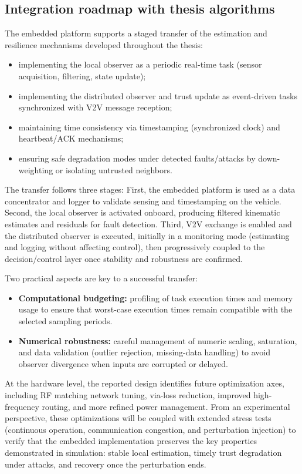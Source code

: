 \subsection{Integration roadmap with thesis algorithms}\label{chp6_subsec_board_roadmap}
The embedded platform supports a staged transfer of the estimation and resilience mechanisms developed throughout the thesis:
\begin{itemize}
	\item implementing the local observer as a periodic real-time task (sensor acquisition, filtering, state update);
	\item implementing the distributed observer and trust update as event-driven tasks synchronized with V2V message reception;
	\item maintaining time consistency via timestamping (synchronized clock) and heartbeat/ACK mechanisms;
	\item ensuring safe degradation modes under detected faults/attacks by down-weighting or isolating untrusted neighbors.
\end{itemize}
The transfer follows three stages:
First, the embedded platform is used as a data concentrator and logger to validate sensing and timestamping on the vehicle.
Second, the local observer is activated onboard, producing filtered kinematic estimates and residuals for fault detection.
Third, V2V exchange is enabled and the distributed observer is executed, initially in a monitoring mode (estimating and logging without affecting control), then progressively coupled to the decision/control layer once stability and robustness are confirmed.

Two practical aspects are key to a successful transfer:
\begin{itemize}
    \item \textbf{Computational budgeting:} profiling of task execution times and memory usage to ensure that worst-case execution times remain compatible with the selected sampling periods.
    \item \textbf{Numerical robustness:} careful management of numeric scaling, saturation, and data validation (outlier rejection, missing-data handling) to avoid observer divergence when inputs are corrupted or delayed.
\end{itemize}
At the hardware level, the reported design identifies future optimization axes, including RF matching network tuning, via-loss reduction, improved high-frequency routing, and more refined power management.
From an experimental perspective, these optimizations will be coupled with extended stress tests (continuous operation, communication congestion, and perturbation injection) to verify that the embedded implementation preserves the key properties demonstrated in simulation: stable local estimation, timely trust degradation under attacks, and recovery once the perturbation ends.

